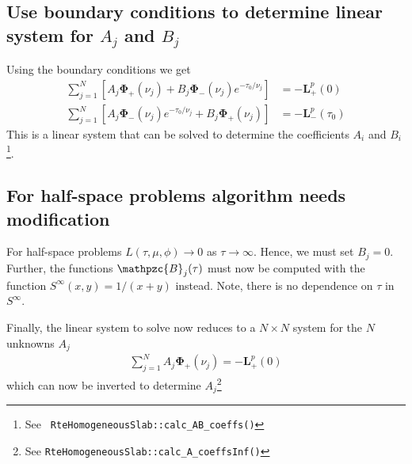\documentclass[11pt]{article}
\newcommand{\mvec}[1]{\mathbf{#1}}
\newcommand{\gvec}[1]{\boldsymbol{#1}}
\newcommand{\script}[1]{\mathpzc{#1}}
\begin{document}
\subsection{Use boundary conditions to determine linear system for
  $A_j$ and $B_j$}
Using the boundary conditions we get
\begin{align}
  \sum_{j=1}^N
  \left[
    A_j \gvec{\Phi}_+(\nu_j) +
    B_j \gvec{\Phi}_-(\nu_j) e^{-\tau_0/\nu_j}
  \right]
  &= -\mvec{L}_+^p(0) \\
  \sum_{j=1}^N
  \left[
    A_j \gvec{\Phi}_-(\nu_j) e^{-\tau_0/\nu_j} +
    B_j \gvec{\Phi}_+(\nu_j)
  \right]
  &= -\mvec{L}_-^p(\tau_0)
\end{align}
This is a linear system that can be solved to determine the
coefficients $A_i$ and $B_i$\footnote{See {\tt
    RteHomogeneousSlab::calc\_AB\_coeffs()}}.





\subsection{For half-space problems algorithm needs modification}
For half-space problems $L(\tau,\mu,\phi) \rightarrow 0$ as $\tau
\rightarrow \infty$. Hence, we must set $B_j = 0$. Further, the
functions $\script{B}_j(\tau)$ must now be computed with the
function $S^\infty(x,y) = 1/(x+y)$ instead. Note, there is no
dependence on $\tau$ in $S^\infty$.

Finally, the linear system to solve now reduces to a $N\times N$
system for the $N$ unknowns $A_j$
\begin{align}
  \sum_{j=1}^N
  A_j \gvec{\Phi}_+(\nu_j) = -\mvec{L}_+^p(0)
\end{align}
which can now be inverted to determine $A_j$\footnote{See
  {\tt RteHomogeneousSlab::calc\_A\_coeffsInf()}}
\end{document}
